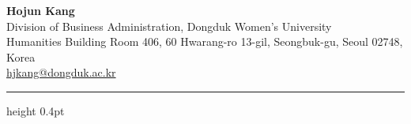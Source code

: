 \documentclass[11pt,a4paper]{article}
\begin{document}
\begin{center}
  {\LARGE\bfseries Hojun Kang}\\[0.2em]
  {\small Division of Business Administration, Dongduk Women's University}\\[0.15em]
  {\small Humanities Building Room 406, 60 Hwarang-ro 13-gil, Seongbuk-gu, Seoul 02748, Korea}\\[0.15em]
  {\small \href{mailto:hjkang@dongduk.ac.kr}{hjkang@dongduk.ac.kr}}
\end{center}

\vspace{0.9em}
\hrule height 0.4pt
\vspace{0.4em}


\end{document}
